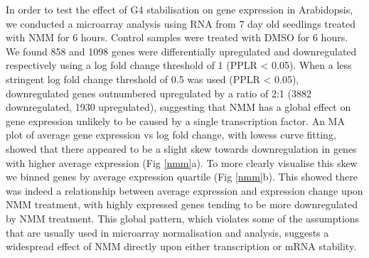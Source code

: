 \documentclass[12pt,a4paper,]{report}
\begin{document}
In order to test the effect of G4 stabilisation on gene expression in
Arabidopsis, we conducted a microarray analysis using RNA from 7 day old
seedlings treated with NMM for 6 hours. Control samples were treated
with DMSO for 6 hours. We found 858 and 1098 genes were differentially
upregulated and downregulated respectively using a log fold change
threshold of 1 (PPLR \textless{} 0.05). When a less stringent log fold
change threshold of 0.5 was used (PPLR \textless{} 0.05), downregulated
genes outnumbered upregulated by a ratio of 2:1 (3882 downregulated,
1930 upregulated), suggesting that NMM has a global effect on gene
expression unlikely to be caused by a single transcription factor. An MA
plot of average gene expression vs log fold change, with lowess curve
fitting, showed that there appeared to be a slight skew towards
downregulation in genes with higher average expression (Fig \ref{nmm}a).
To more clearly visualise this skew we binned genes by average
expression quartile (Fig \ref{nmm}b). This showed there was indeed a
relationship between average expression and expression change upon NMM
treatment, with highly expressed genes tending to be more downregulated
by NMM treatment. This global pattern, which violates some of the
assumptions that are usually used in microarray normalisation and
analysis, suggests a widespread effect of NMM directly upon either
transcription or mRNA stability.

\newpage
\end{document}
